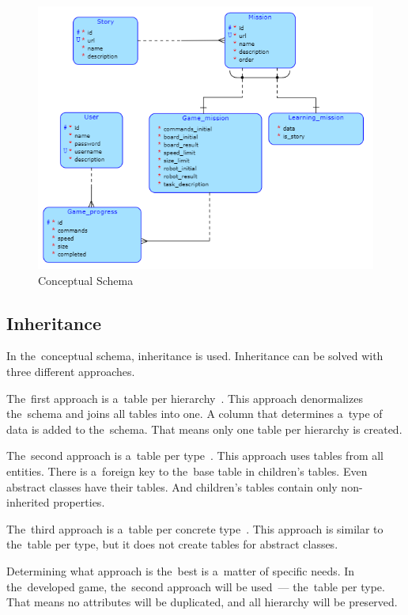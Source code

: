 \begin{figure}
    \centering
    \includegraphics[width=1\linewidth]{assets/design/conceptualdiagram.png}
    \caption{Conceptual Schema}
    \label{fig:design:conceptualschema}
\end{figure}

\subsection{Inheritance}

In the~conceptual schema, inheritance is used.
Inheritance can be solved with three different approaches.

The~first approach is a~table per hierarchy~\cite{a2010_enterprise}.
This approach denormalizes the~schema and joins all tables into one.
A column that determines a~type of data is added to the~schema.
That means only one table per hierarchy is created.

The~second approach is a~table per type~\cite{a2010_enterprise}.
This approach uses tables from all entities.
There is a~foreign key to the~base table in children's tables.
Even abstract classes have their tables.
And children's tables contain only non-inherited properties.

The~third approach is a~table per concrete type~\cite{a2010_enterprise}.
This approach is similar to the~table per type, but it does not create tables for abstract classes.

Determining what approach is the~best is a~matter of specific needs.
In the~developed game, the~second approach will be used~--- the~table per type.
That means no attributes will be duplicated, and all hierarchy will be preserved.

